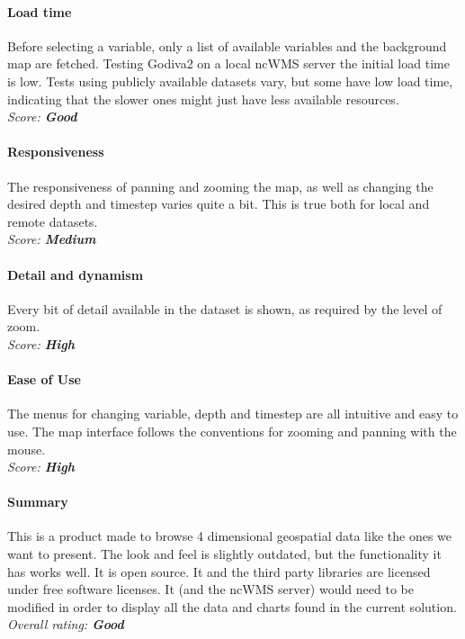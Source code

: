 \documentclass[11pt,a4paper,titlepage,oneside]{report}
\begin{document}
	\paragraph{Load time}
	Before selecting a variable, only a list of available variables and the background map are fetched. Testing Godiva2 on a local ncWMS server the initial load time is low. Tests using publicly available datasets vary, but some have low load time, indicating that the slower ones might just have less available resources.
   \\ \emph{Score: \textbf{Good}}
	
	\paragraph{Responsiveness}
	The responsiveness of panning and zooming the map, as well as changing the desired depth and timestep varies quite a bit. This is true both for local and remote datasets.
   \\ \emph{Score: \textbf{Medium}}
	
	\paragraph{Detail and dynamism}
	Every bit of detail available in the dataset is shown, as required by the level of zoom.
   \\ \emph{Score: \textbf{High}}
	
	\paragraph{Ease of Use}
	The menus for changing variable, depth and timestep are all intuitive and easy to use. The map interface follows the conventions for zooming and panning with the mouse.
   \\ \emph{Score: \textbf{High}}
	
	\paragraph{Summary}
	This is a product made to browse 4 dimensional geospatial data like the ones we want to present. The look and feel is slightly outdated, but the functionality it has works well. It is open source. It and the third party libraries are licensed under free software licenses. It (and the ncWMS server) would need to be modified in order to display all the data and charts found in the current solution.
   \\ \emph{Overall rating: \textbf{Good}}
	
\end{document}
